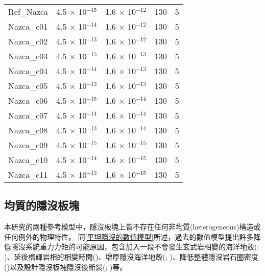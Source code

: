 \begin{table}[htp]
\begin{tabular}{|lllll|}
        Ref\_Nazca   & 4.5 $\times$ 10$^{-15}$ & 1.6 $\times$ 10$^{-12}$ & 130       & 5            \\
        Nazca\_c01 & 4.5 $\times$ 10$^{-14}$ & 1.6 $\times$ 10$^{-12}$ & 130       & 5            \\
        Nazca\_c02 & 4.5 $\times$ 10$^{-13}$ & 1.6 $\times$ 10$^{-12}$ & 130       & 5            \\
        Nazca\_c03 & 4.5 $\times$ 10$^{-15}$ & 1.6 $\times$ 10$^{-13}$ & 130       & 5            \\
        Nazca\_c04 & 4.5 $\times$ 10$^{-14}$ & 1.6 $\times$ 10$^{-13}$ & 130       & 5            \\
        Nazca\_c05 & 4.5 $\times$ 10$^{-13}$ & 1.6 $\times$ 10$^{-13}$ & 130       & 5            \\
        Nazca\_c06 & 4.5 $\times$ 10$^{-15}$ & 1.6 $\times$ 10$^{-14}$ & 130       & 5            \\
        Nazca\_c07 & 4.5 $\times$ 10$^{-14}$ & 1.6 $\times$ 10$^{-14}$ & 130       & 5            \\
        Nazca\_c08 & 4.5 $\times$ 10$^{-13}$ & 1.6 $\times$ 10$^{-14}$ & 130       & 5            \\
        Nazca\_c09 & 4.5 $\times$ 10$^{-15}$ & 1.6 $\times$ 10$^{-15}$ & 130       & 5            \\
        Nazca\_c10 & 4.5 $\times$ 10$^{-14}$ & 1.6 $\times$ 10$^{-15}$ & 130       & 5            \\
        Nazca\_c11 & 4.5 $\times$ 10$^{-13}$ & 1.6 $\times$ 10$^{-15}$ & 130       & 5            \\ \hline
    \end{tabular}
\end{table}

\subsection{均質的隱沒板塊}
本研究的兩種參考模型中，隱沒板塊上皆不存在任何非均質(heterogeneous)構造或任何例外的物理特性。
同\ref{平坦隱沒的數值模型}所述，過去的數值模型提出許多降低隱沒系統重力力矩的可能原因，包含加入一段不會發生玄武岩相變的海洋地殼(\citealp{Liu2016}; \citealp{Gerya2009})、延後榴輝岩相的相變時間(\citealp{van2002role})、增厚隱沒海洋地殼(\citealp{Liu2016}; \citealp{axen2018basal})、降低整體隱沒岩石圈密度(\citealp{Gerya2009})以及設計隱沒板塊隱沒後斷裂(\citealp{Liu2016}; \citealp{axen2018basal})等。

